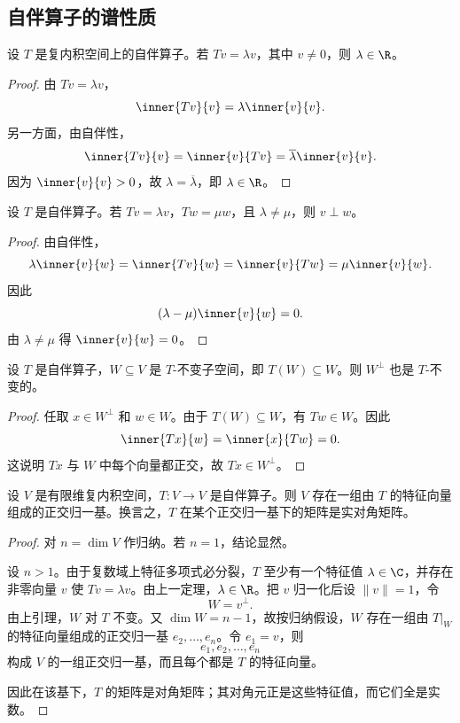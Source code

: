 \subsection{自伴算子的谱性质}

\begin{theorem}
设 $T$ 是复内积空间上的自伴算子。若 $Tv=\lambda v$，其中 $v\ne 0$，则 $\lambda\in\R$。
\end{theorem}

\begin{proof}
由 $Tv=\lambda v$，
\[
\inner{Tv}{v}=\lambda\inner{v}{v}.
\]
另一方面，由自伴性，
\[
\inner{Tv}{v}=\inner{v}{Tv}=\overline{\lambda}\inner{v}{v}.
\]
因为 $\inner{v}{v}>0$，故 $\lambda=\overline{\lambda}$，即 $\lambda\in\R$。
\end{proof}

\begin{theorem}
设 $T$ 是自伴算子。若 $Tv=\lambda v$，$Tw=\mu w$，且 $\lambda\ne\mu$，则 $v\perp w$。
\end{theorem}

\begin{proof}
由自伴性，
\[
\lambda\inner{v}{w}=\inner{Tv}{w}=\inner{v}{Tw}=\mu\inner{v}{w}.
\]
因此
\[
(\lambda-\mu)\inner{v}{w}=0.
\]
由 $\lambda\ne\mu$ 得 $\inner{v}{w}=0$。
\end{proof}

\begin{lemma}
设 $T$ 是自伴算子，$W\subseteq V$ 是 $T$-不变子空间，即 $T(W)\subseteq W$。则 $W^{\perp}$ 也是 $T$-不变的。
\end{lemma}

\begin{proof}
任取 $x\in W^{\perp}$ 和 $w\in W$。由于 $T(W)\subseteq W$，有 $Tw\in W$。因此
\[
\inner{Tx}{w}=\inner{x}{Tw}=0.
\]
这说明 $Tx$ 与 $W$ 中每个向量都正交，故 $Tx\in W^{\perp}$。
\end{proof}

\begin{theorem}
设 $V$ 是有限维复内积空间，$T:V\to V$ 是自伴算子。则 $V$ 存在一组由 $T$ 的特征向量组成的正交归一基。换言之，$T$ 在某个正交归一基下的矩阵是实对角矩阵。
\end{theorem}

\begin{proof}
对 $n=\dim V$ 作归纳。若 $n=1$，结论显然。

设 $n>1$。由于复数域上特征多项式必分裂，$T$ 至少有一个特征值 $\lambda\in\C$，并存在非零向量 $v$ 使 $Tv=\lambda v$。由上一定理，$\lambda\in\R$。把 $v$ 归一化后设 $\|v\|=1$，令
\[
W=v^{\perp}.
\]
由上引理，$W$ 对 $T$ 不变。又 $\dim W=n-1$，故按归纳假设，$W$ 存在一组由 $T|_W$ 的特征向量组成的正交归一基 $e_2,\dots,e_n$。令 $e_1=v$，则
\[
e_1,e_2,\dots,e_n
\]
构成 $V$ 的一组正交归一基，而且每个都是 $T$ 的特征向量。

因此在该基下，$T$ 的矩阵是对角矩阵；其对角元正是这些特征值，而它们全是实数。
\end{proof}

